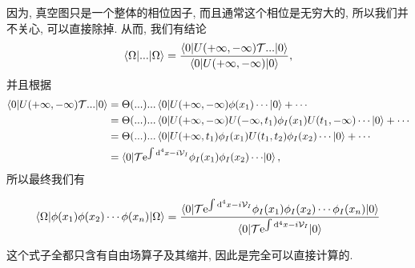 因为, 真空图只是一个整体的相位因子, 而且通常这个相位是无穷大的, 所以我们并不关心, 可以直接除掉. 从而, 我们有结论
\begin{equation}
    \braket{\Omega|...|\Omega}=\frac{\braket{0|U(+\infty, -\infty)\mathcal T...|0}}{\braket{0|U(+\infty, -\infty)|0}},
\end{equation}
并且根据
\begin{align}
    \braket{0|U(+\infty, -\infty)\mathcal T...|0}&=\Theta(...)...\braket{0|U(+\infty, -\infty)\phi(x_1)\cdots|0}+\cdots\\
    &=\Theta(...)...\braket{0|U(+\infty, -\infty)U(-\infty, t_1)\phi_I(x_1)U(t_1, -\infty)\cdots|0}+\cdots\\
    &=\Theta(...)...\braket{0|U(+\infty, t_1)\phi_I(x_1)U(t_1, t_2)\phi_I(x_2)\cdots|0}+\cdots\\
    &=\braket{0|\mathcal T{\mathrm e^{\int\mathrm d^4x -i\mathcal V_I}\phi_I(x_1)\phi_I(x_2)\cdots}|0},
\end{align}
所以最终我们有
\begin{important}
    \begin{equation}
        \braket{\Omega|\phi(x_1)\phi(x_2)\cdots\phi(x_n)|\Omega}=\frac{\braket{0|\mathcal T{\mathrm e^{\int\mathrm d^4x -i\mathcal V_I}\phi_I(x_1)\phi_I(x_2)\cdots\phi_I(x_n)}|0}}{\braket{0|\mathcal T\mathrm e^{\int\mathrm d^4x -i\mathcal V_I}|0}}\label{corrleation-dyson-series}
    \end{equation}
\end{important}
这个式子全都只含有自由场算子及其缩并, 因此是完全可以直接计算的.

